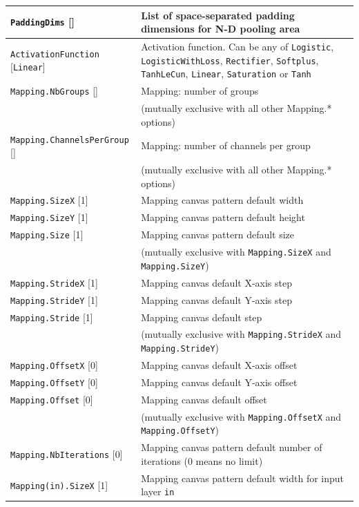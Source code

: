 \documentclass[a4paper,11pt,oneside]{article}
\begin{document}
\begin{center}
\begin{longtable}{| p{5cm} | p{10cm} | }
  \lstinline!PaddingDims! [] & List of space-separated padding dimensions for N-D pooling area \\
  \hline
  \lstinline!ActivationFunction! [\lstinline!Linear!] & Activation function.
  Can be any of \lstinline!Logistic!,  \lstinline!LogisticWithLoss!,
  \lstinline!Rectifier!, \lstinline!Softplus!, \lstinline!TanhLeCun!,
  \lstinline!Linear!, \lstinline!Saturation! or \lstinline!Tanh! \\
  \lstinline!Mapping.NbGroups! [] & Mapping: number of groups \\
   & (mutually exclusive with all other Mapping.* options) \\
  \lstinline!Mapping.ChannelsPerGroup! [] & Mapping: number of channels per group \\
   & (mutually exclusive with all other Mapping.* options) \\
  \lstinline!Mapping.SizeX! [1] & Mapping canvas pattern default width \\
  \lstinline!Mapping.SizeY! [1] & Mapping canvas pattern default height \\
  \lstinline!Mapping.Size! [1] & Mapping canvas pattern default size \\
   & (mutually exclusive with \lstinline!Mapping.SizeX!
   and \lstinline!Mapping.SizeY!) \\
  \lstinline!Mapping.StrideX! [1] & Mapping canvas default X-axis step \\
  \lstinline!Mapping.StrideY! [1] & Mapping canvas default Y-axis step \\
  \lstinline!Mapping.Stride! [1] & Mapping canvas default step \\
   & (mutually exclusive with \lstinline!Mapping.StrideX!
   and \lstinline!Mapping.StrideY!) \\
  \lstinline!Mapping.OffsetX! [0] & Mapping canvas default X-axis offset \\
  \lstinline!Mapping.OffsetY! [0] & Mapping canvas default Y-axis offset \\
  \lstinline!Mapping.Offset! [0] & Mapping canvas default offset \\
   & (mutually exclusive with \lstinline!Mapping.OffsetX!
   and \lstinline!Mapping.OffsetY!) \\
  \lstinline!Mapping.NbIterations! [0] & Mapping canvas pattern default number
   of iterations (0 means no limit) \\
  \lstinline!Mapping(in).SizeX! [1] & Mapping canvas pattern default width
  for input layer \lstinline!in! \\

\end{longtable}
\end{center}
\end{document}
